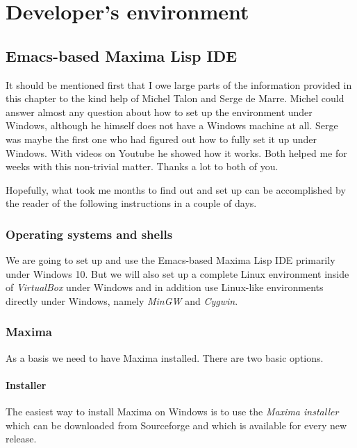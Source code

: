 \documentclass[../Maxima_Workbook.tex]{subfiles}
\begin{document}
\part{Developer's environment}
	
\chapter{Emacs-based Maxima Lisp IDE}

It should be mentioned first that I owe large parts of the information provided in this chapter to the kind help of Michel Talon and Serge de Marre. Michel could answer almost any question about how to set up the environment under Windows, although he himself does not have a Windows machine at all. Serge was maybe the first one who had figured out how to fully set it up under Windows. With videos on Youtube he showed how it works. Both helped me for weeks with this non-trivial matter. Thanks a lot to both of you.

\lz Hopefully, what took me months to find out and set up can be accomplished by the reader of the following instructions in a couple of days. 

\section{Operating systems and shells}

We are going to set up and use the Emacs-based Maxima Lisp IDE primarily under Windows 10. But we will also set up a complete Linux environment inside of \emph{VirtualBox} under Windows and in addition use Linux-like environments directly under Windows, namely \emph{MinGW} and \emph{Cygwin}. 

\section{Maxima}

As a basis we need to have Maxima installed. There are two basic options.

\subsection{Installer}

The easiest way to install Maxima on Windows is to use the \emph{Maxima installer} which can be downloaded from Sourceforge and which is available for every new release. 
\end{document}
